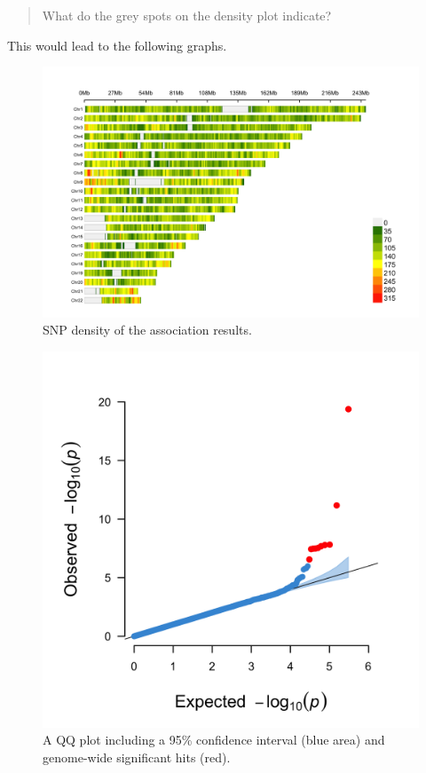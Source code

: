 \documentclass[
]{book}
\begin{document}
\begin{quote}
What do the grey spots on the density plot indicate?
\end{quote}

This would lead to the following graphs.

\begin{figure}[H]

{\centering \includegraphics[width=37.5in]{img/_gwas_dummy/show-cmplot-all-density} 

}

\caption{SNP density of the association results.}\label{fig:show-cmplot-all-density}
\end{figure}

\begin{figure}[H]

{\centering \includegraphics[width=22.92in]{img/_gwas_dummy/show-cmplot-all-qq} 

}

\caption{A QQ plot including a 95\% confidence interval (blue area) and genome-wide significant hits (red).}\label{fig:show-cmplot-all-qq}
\end{figure}
\end{document}
